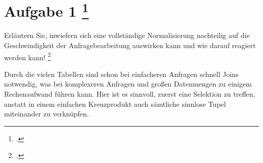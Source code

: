 \documentclass{lehramt-informatik-aufgabe}
\begin{document}

\section{Aufgabe 1
\footcite[Thema 2 Aufgabe 1]{66113:2003:09}}

Erläutern Sie, inwiefern sich eine vollständige Normalisierung
nachteilig auf die Geschwindigkeit der Anfragebearbeitung auswirken kann
und wie darauf reagiert werden kann!
\footcite[Aufgabe 10: Nachteile der Normalisierung]{db:ab:klausurvorbereitung}

\begin{antwort}
Durch die vielen Tabellen sind schon bei einfacheren Anfragen schnell
Joins notwendig, was bei komplexeren Anfragen und großen Datenmengen zu
einigem Rechenaufwand führen kann. Hier ist es sinnvoll, zuerst eine
Selektion zu treffen, anstatt in einem einfachen Kreuzprodukt
auch sämtliche sinnlose Tupel miteinander zu verknüpfen.
\end{antwort}
\end{document}
